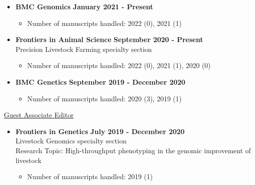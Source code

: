 \documentclass[margin,line,10pt]{res}
\begin{document}
\begin{resume}
  \vspace{0.3cm}

\begin{itemize}
\item {\bf BMC Genomics} \hfill {\bf January 2021 - Present}
  \begin{itemize}
    \item Number of manuscripts handled: 2022 (0), 2021 (1)
  \end{itemize}
\end{itemize}

\vspace{0.3cm}

\begin{itemize}
\item {\bf Frontiers in Animal Science} \hfill {\bf September 2020 - Present} \\
   Precision Livestock Farming specialty section
  \begin{itemize}
    \item Number of manuscripts handled: 2022 (0), 2021 (1), 2020 (0)
  \end{itemize}
\end{itemize}

\vspace{0.3cm}

\begin{itemize}
\item {\bf BMC Genetics} \hfill {\bf September 2019 - December 2020}
  \begin{itemize}
    \item Number of manuscripts handled: 2020 (3), 2019 (1)
  \end{itemize}
\end{itemize}

\vspace{0.3cm}

\underline{Guest Associate Editor}
\vspace{0.2cm}
\begin{itemize}
\item {\bf Frontiers in Genetics} \hfill  {\bf July 2019 - December 2020} \\
  Livestock Genomics specialty section \\
  Research Topic: High-throughput phenotyping in the genomic improvement of livestock
  \begin{itemize}
    \item Number of manuscripts handled: 2019 (1)
  \end{itemize}
\end{itemize}
\vspace{0.3cm}



\end{resume}
\end{document}
